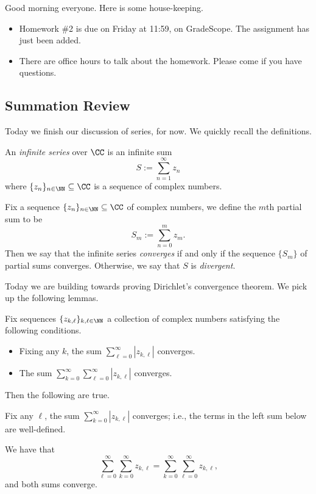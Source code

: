 
Good morning everyone. Here is some house-keeping.
\begin{itemize}
	\item Homework \#2 is due on Friday at 11:59, on GradeScope. The assignment has just been added.
	\item There are office hours to talk about the homework. Please come if you have questions.
\end{itemize}

\subsection{Summation Review}
Today we finish our discussion of series, for now. We quickly recall the definitions.
\begin{definition}[Series]
	An \textit{infinite series} over $\CC$ is an infinite sum
	\[S:=\sum_{n=1}^\infty z_n\]
	where $\{z_n\}_{n\in\NN}\subseteq\CC$ is a sequence of complex numbers.
\end{definition}
\begin{definition}
	Fix a sequence $\{z_n\}_{n\in\NN}\subseteq\CC$ of complex numbers, we define the $m$th partial sum to be
	\[S_m:=\sum_{n=0}^mz_m.\]
	Then we say that the infinite series \textit{converges} if and only if the sequence $\{S_m\}$ of partial sums converges. Otherwise, we say that $S$ is \textit{divergent}.
\end{definition}
Today we are building towards proving Dirichlet's convergence theorem. We pick up the following lemmas.
\begin{lemma}
	Fix sequences $\{z_{k,\ell}\}_{k,\ell\in\NN}$ a collection of complex numbers satisfying the following conditions.
	\begin{itemize}
		\item Fixing any $k$, the sum $\sum_{\ell=0}^\infty|z_{k,\ell}|$ converges.
		\item The sum $\sum_{k=0}^\infty\sum_{\ell=0}^\infty|z_{k,\ell}|$ converges.
	\end{itemize}
	Then the following are true.
	\begin{listalph}
		\item Fix any $\ell$, the sum $\sum_{k=0}^\infty|z_{k,\ell}|$ converges; i.e., the terms in the left sum below are well-defined.
		\item We have that
		\[\sum_{\ell=0}^\infty\sum_{k=0}^\infty z_{k,\ell}=\sum_{k=0}^\infty\sum_{\ell=0}^\infty z_{k,\ell},\]
		and both sums converge.
	\end{listalph}
\end{lemma}
